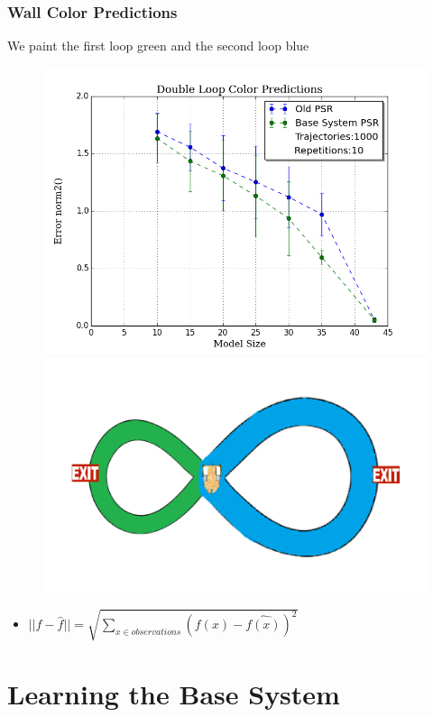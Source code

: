 \documentclass{beamer}
\begin{document}
\begin{frame}
\frametitle{Wall Color Predictions}
We paint the first loop green and the second loop blue
\begin{figure}
\includegraphics[width=0.6\linewidth]{uCOREPICS/MultipleObservations.png}
\includegraphics[width=0.4\linewidth]{lucasplots/monImages/doubleLoopImageMO.png}

\end{figure}

\begin{itemize}

\item[] $||f - \hat{f}|| = \sqrt{\sum\nolimits_{x \in observations}(f(x) - \hat{f(x)})^2}$ 
\end{itemize}

\end{frame}



\section{Learning the Base System}
\end{document}
